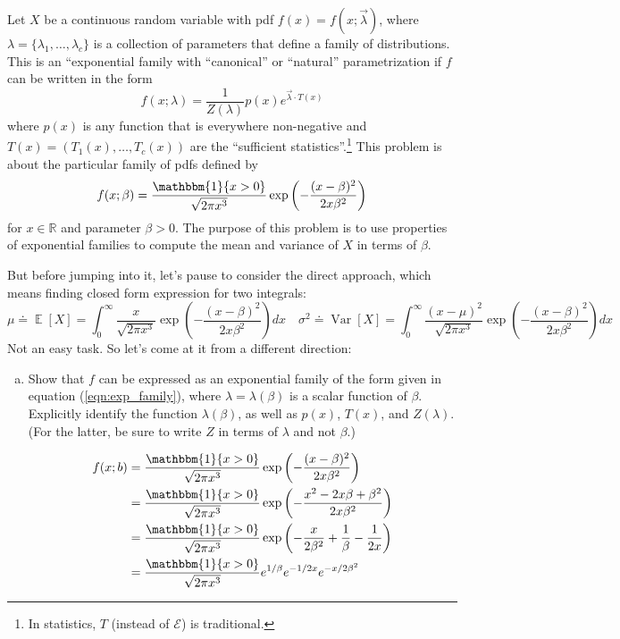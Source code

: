 \documentclass[11pt]{report}
\DeclareMathOperator{\Exp}{\mathbb{E}}
\DeclareMathOperator{\Var}{\text{Var}}
\newcommand{\ind}{{\mathbbm{1}}}
\begin{document}
\begin{enumerate}[1.]
          Let $X$ be a continuous random variable with pdf $f(x) = f(x;\vec{\lambda})$, where $\lambda = \{\lambda_1,\ldots,\lambda_c\}$ is a collection of parameters that define a family of distributions. This is an ``exponential family with ``canonical'' or ``natural'' parametrization if $f$ can be written in the form
          \begin{equation}
              \label{eqn:exp_family}
              f(x;\lambda) = \frac{1}{Z(\lambda)}p(x)e^{\vec{\lambda}\cdot
                      T(x)}
          \end{equation}
          where $p(x)$ is any function that is everywhere non-negative and
          $T(x) = (T_1(x),\ldots,T_c(x))$ are the ``sufficient statistics''.\footnote{In statistics, $T$ (instead of ${\mathcal E}$) is traditional.}
          This problem is about the particular family of pdfs defined by
          \[
              f(x;\beta) = \frac{\ind\{x > 0\}}{\sqrt{2\pi x^3}}\exp\left(-\frac{(x-\beta)^2}{2x\beta^2}\right)
          \]
          for $x\in\mathbb{R}$ and parameter $\beta > 0$. The purpose of this problem is to use properties of exponential families to compute the mean and variance of $X$ in terms of $\beta$.

          But before jumping into it, let's pause to consider the direct approach, which means finding closed form expression for two integrals:
          \[
              \mu \doteq \Exp[X] = \int_0^\infty \frac{x}{\sqrt{2\pi x^3}}\exp\left(-\frac{(x-\beta)^2}{2x\beta^2}\right) dx
              \quad
              \sigma^2 \doteq \Var[X] = \int_0^\infty \frac{(x-\mu)^2}{\sqrt{2\pi x^3}}\exp\left(-\frac{(x-\beta)^2}{2x\beta^2}\right) dx
          \]
          Not an easy task. So let's come at it from a different direction:


          \begin{enumerate}[(a)]
              \item Show that $f$ can be expressed as an exponential family of the form given in equation (\ref{eqn:exp_family}), where
                    $\lambda = \lambda(\beta)$ is a scalar function of $\beta$.
                    Explicitly identify the function $\lambda(\beta)$, as well as $p(x)$,  $T(x)$, and $Z(\lambda)$. (For the latter, be sure to write $Z$ in terms of $\lambda$ and not $\beta$.)

                    \color{blue}
                    \begin{align*}
                        f(x; b) & = \frac{\ind\{x> 0\}}{\sqrt{2\pi x^3}} \exp\left(-\frac{(x- \beta)^2}{2x\beta^2}\right)                      \\
                                & = \frac{\ind\{x> 0\}}{\sqrt{2\pi x^3}} \exp\left(-\frac{x^2 - 2x\beta + \beta^2}{2x\beta^2}\right)           \\
                                & = \frac{\ind\{x> 0\}}{\sqrt{2\pi x^3}} \exp\left(-\frac{x}{2\beta^2} + \frac{1}{\beta} - \frac{1}{2x}\right) \\
                                & = \frac{\ind\{x> 0\}}{\sqrt{2\pi x^3}} e^{1/\beta} e^{-1/2x} e^{-x/2\beta^2}
                    \end{align*}


\end{enumerate}
\end{enumerate}
\end{document}
